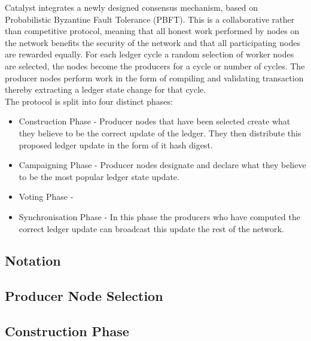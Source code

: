 \documentclass{article}
\begin{document}
Catalyst integrates a newly designed consensus mechanism, based on Probabilistic Byzantine Fault Tolerance (PBFT).  This is a collaborative rather than competitive protocol, meaning that all honest work performed by nodes on the network benefits the security of the network and that all participating nodes are rewarded equally. For each ledger cycle a random selection of worker nodes are selected, the nodes become the producers for a cycle or number of cycles. The producer nodes perform work in the form of compiling and validating transaction thereby extracting a ledger state change for that cycle. \\

The protocol is split into four distinct phases:

\begin{itemize}

\item Construction Phase - Producer nodes that have been selected create what they believe to be the correct update of the ledger. They then distribute this proposed ledger update in the form of it hash digest.
\item Campaigning Phase - Producer nodes designate and declare what they believe to be the most popular ledger state update. 
\item Voting Phase - 	
\item Synchronisation Phase - In this phase the producers who have computed the correct ledger update can broadcast this update the rest of the network. 

\end{itemize} 

\subsection{Notation} 

\subsection{Producer Node Selection} 


\subsection{Construction Phase}
\end{document}
